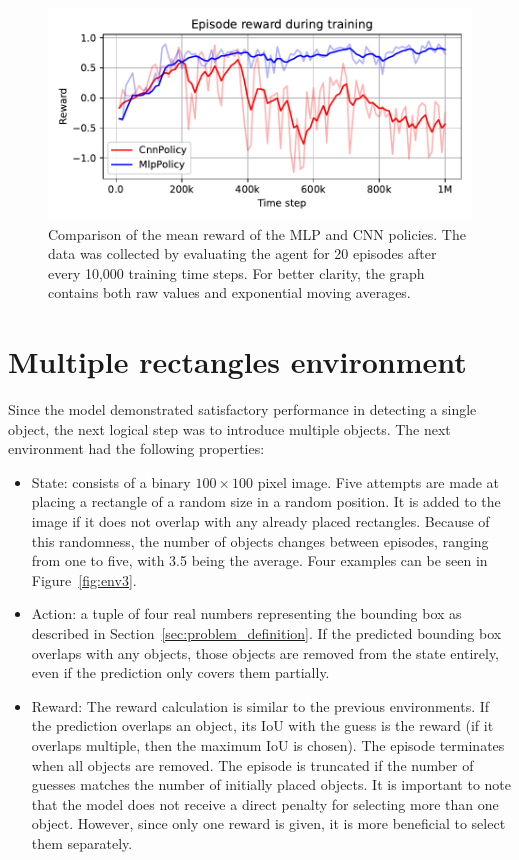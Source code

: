 \documentclass[
  digital,     %
  oneside,     %
  nosansbold,  %
  nocolorbold, %
  lof,         %
  lot,         %
]{fithesis4}
\begin{document}
\begin{figure}
    \includegraphics[width=1\linewidth]{graphs/v2_mpl_cnn.pdf}
    \caption{Comparison of the mean reward of the MLP and CNN policies. The data was collected by evaluating the agent for 20 episodes after every 10,000 training time steps. For better clarity, the graph contains both raw values and exponential moving averages.}
    \label{fig:v2_mlp_cnn}
\end{figure}

\section{Multiple rectangles environment}
\label{sec:multi-rect}
Since the model demonstrated satisfactory performance in detecting a single object, the next logical step was to introduce multiple objects. The next environment had the following properties:
\begin{itemize}
    \item State: consists of a binary $100\times100$ pixel image. Five attempts are made at placing a rectangle of a random size in a random position. It is added to the image if it does not overlap with any already placed rectangles. Because of this randomness, the number of objects changes between episodes, ranging from one to five, with 3.5 being the average. Four examples can be seen in Figure~\ref{fig:env3}.
    \item Action: a tuple of four real numbers representing the bounding box as described in Section~\ref{sec:problem_definition}. If the predicted bounding box overlaps with any objects, those objects are removed from the state entirely, even if the prediction only covers them partially.
    \item Reward: The reward calculation is similar to the previous environments. If the prediction overlaps an object, its IoU with the guess is the reward (if it overlaps multiple, then the maximum IoU is chosen). The episode terminates when all objects are removed. The episode is truncated if the number of guesses matches the number of initially placed objects. It is important to note that the model does not receive a direct penalty for selecting more than one object. However, since only one reward is given, it is more beneficial to select them separately.
\end{itemize}
\end{document}
